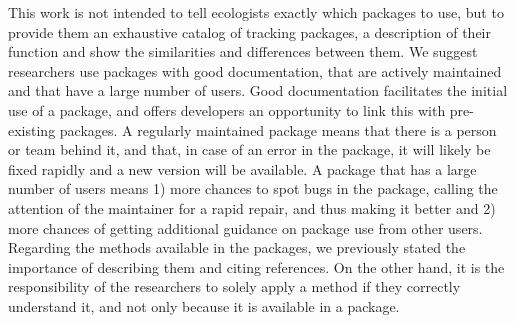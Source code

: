 \documentclass[a4paper,12pt]{article}
\begin{document}
This work is not intended to tell ecologists exactly which packages to use, %
but to provide them an exhaustive catalog of tracking packages, a description of their function and show the similarities and differences between them. We suggest researchers use packages with good documentation, that are actively maintained and that have a large number of users. Good documentation facilitates the initial use of a package, and offers developers an opportunity to link this with pre-existing packages. %
A regularly maintained package means that there is a person or team behind it, and that, in case of an error in the package, it will likely be fixed rapidly and a new version will be available. A package that has a large number of users means 1) more chances to spot bugs in the package, calling the attention of the maintainer for a rapid repair, and thus making it better and 2) more chances of getting additional guidance on package use from other users. Regarding the methods available in the packages, we previously stated the importance of describing them and citing references. On the other hand, it is the responsibility of the researchers to solely apply a method if they correctly understand it, and not only because it is available in a package. 
\end{document}
